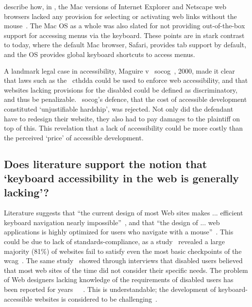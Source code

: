 \documentclass[a4paper, 11pt]{article}
\begin{document}
\citeauthor{hendrix1997adapting} describe how, in \citeyear{hendrix1997adapting}, the Mac versions of Internet Explorer and Netscape web browsers lacked any provision for selecting or activating web links without the mouse~\cite{hendrix1997adapting}. The Mac OS as a whole was also slated for not providing out-of-the-box support for accessing menus via the keyboard. These points are in stark contrast to today, where the default Mac browser, Safari, provides tab support by default\cite{safaria11y}, and the OS provides global keyboard shortcuts to access menus\cite{macshortcuts}.

A landmark legal case in accessibility, Maguire v ~\gls{socog}~\cite{sloan2001web,russell2003access}, 2000, made it clear that laws such as the ~\gls{cthdda} could be used to enforce web accessibility, and that websites lacking provisions for the disabled could be defined as discriminatory, and thus be penalizable. ~\gls{socog}'s defence, that the cost of accessible development constituted `unjustifiable hardship', was rejected. Not only did the defendant have to redesign their website, they also had to pay damages to the plaintiff on top of this. This revelation that a lack of accessibility could be more costly than the perceived `price' of accessible development.
\subsection{Does literature support the notion that `keyboard accessibility in the web is generally lacking'?}
Literature suggests that ``the current design of most Web sites makes ... efficient keyboard navigation nearly impossible''~\parencite[][p.1]{schrepp2006efficiency}, and that ``the design of ... web applications is highly optimized for users who navigate with a mouse''~\parencite[][p.1]{schrepp2006efficiency}. This could be due to lack of standards-compliance, as a \citeyear{disability2004web} study~\cite{disability2004web} revealed a large majority (81\%) of websites fail to satisfy even the most basic checkpoints of the \gls{wcag}~\cite{chisholm2001web,wcag}. The same study~\cite{disability2004web} showed through interviews that disabled users believed that most web sites of the time did not consider their specific needs.
The problem of Web designers lacking knowledge of the requirements of disabled users has been reported for years~\cite{disability2004web}~\cite{coyne2001beyond}~\cite{velasco2001raising}. This is understandable; the development of keyboard-accessible websites is considered to be challenging~\cite{watanabe2012using}.
\end{document}
